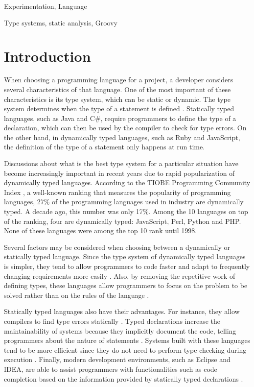 \documentclass[preprint]{sigplanconf}
\begin{document}

\terms
Experimentation, Language

\keywords
Type systems, static analysis, Groovy

\section{Introduction}
When choosing a programming language for a project, a developer considers several characteristics of that language.
One of the most important of these characteristics is its type system, which can be static or dynamic.
The type system determines when the type of a statement is defined \cite{types_and_programming_languages}. 
Statically typed languages, such as Java and C\#, require programmers to define the type of a declaration, which can then be used by the compiler to check for type errors. 
On the other hand, in dynamically typed languages, such as Ruby and JavaScript, the definition of the type of a statement only happens at run time.

Discussions about what is the best type system for a particular situation have become increasingly important in recent years due to rapid popularization of dynamically typed languages. 
According to the TIOBE Programming Community Index \cite{tiobe}, a well-known ranking that measures the popularity of programming languages, 27\% of the programming languages used in industry are dynamically typed. 
A decade ago, this number was only 17\%. 
Among the 10 languages on top of the ranking, four are dynamically typed: JavaScript, Perl, Python and PHP. 
None of these languages were among the top 10 rank until 1998.

Several factors may be considered when choosing between a dynamically or statically typed language. 
Since the type system of dynamically typed languages is simpler, they tend to allow programmers to code faster \cite{types_and_programming_languages} and adapt to frequently changing requirements more easily \cite{gradual_typing}.
Also, by removing the repetitive work of defining types, these languages allow programmers to focus on the problem to be solved rather than on the rules of the language \cite{dynamically_typed_languages}.

Statically typed languages also have their advantages. 
For instance, they allow compilers to find type errors statically \cite{should_your_specification_language_be_typed}. 
Typed declarations increase the maintainability of systems because they implicitly document the code, telling programmers about the nature of statements \cite{type_systems,mayer2012static}. 
Systems built with these languages tend to be more efficient since they do not need to perform type checking during execution \cite{bruce2002foundations,jit}. 
Finally, modern development environments, such as Eclipse and IDEA, are able to assist programmers with functionalities such as code completion based on the information provided by statically typed declarations \cite{bruch2009learning}.
\end{document}
